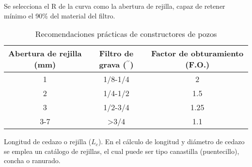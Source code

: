 Se selecciona el R de la curva como la abertura de rejilla, capaz de retener mínimo el 90\% del material del filtro.
\begin{table}[h!]
    \centering
    \begin{tabular}{@{}ccc@{}}
    \toprule
    Abertura de rejilla (mm) & Filtro de grava ($^{\prime\prime}$) & Factor de obturamiento (F.O.) \\ \midrule
    1 & 1/8-1/4 & 2   \\
    2 & 1/4-1/2 & 1.5 \\
    3 & 1/2-3/4 & 1.25   \\
    3-7 & >3/4  & 1.1   \\ \bottomrule
    \end{tabular}
    \caption{Recomendaciones prácticas de constructores de pozos}
    \label{tabgh9}
\end{table}
Longitud de cedazo o rejilla ($L_c$). En el cálculo de longitud y diámetro de cedazo se emplea un catálogo de rejillas, el cual puede ser tipo canastilla (puentecillo), concha o ranurado.
